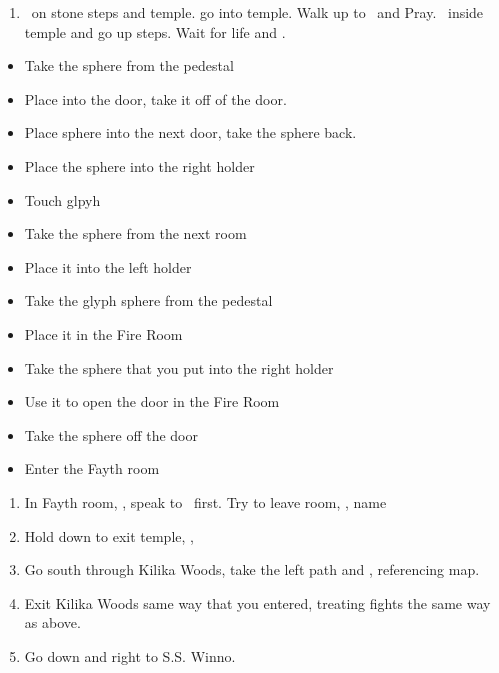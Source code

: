 \begin{enumerate}[resume]
	\item \sd\ on stone steps and temple. go into temple. Walk up to \wakka\ and Pray. \sd\ inside temple and go up steps. Wait for life and \sd.
\end{enumerate}
\begin{trial}
	\begin{itemize}
		\item Take the sphere from the pedestal
		\item Place into the door, take it off of the door.
		\item Place sphere into the next door, take the sphere back.
		\item Place the sphere into the right holder
		\item Touch glpyh
		\item Take the sphere from the next room
		\item Place it into the left holder
		\item Take the glyph sphere from the pedestal
		\item Place it in the Fire Room
		\item Take the sphere that you put into the right holder
		\item Use it to open the door in the Fire Room
		\item Take the sphere off the door
		\item Enter the Fayth room
	\end{itemize}
\end{trial}
\begin{enumerate}[resume]
	\item In Fayth room, \sd, speak to \wakka\ first. Try to leave room, \sd, name \ifrit
	\item Hold down to exit temple, \cs[0:40], \sd
	\item Go south through Kilika Woods, take the left path and , referencing map.
	\item Exit Kilika Woods same way that you entered, treating fights the same way as above.
	\item Go down and right to S.S. Winno. \sd
\end{enumerate}
	